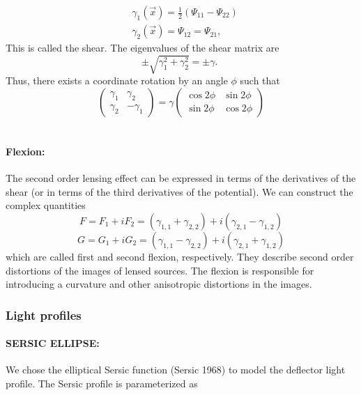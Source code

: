 \documentclass{aa}
\begin{document}
\begin{equation}
    \begin{aligned}
        & \gamma_1(\vec{x})=\frac{1}{2}\left(\Psi_{11}-\Psi_{22}\right) \\
        & \gamma_2(\vec{x})=\Psi_{12}=\Psi_{21},
    \end{aligned}
\end{equation}
%
This is called the shear. The eigenvalues of the shear matrix are
$$
\pm \sqrt{\gamma_1^2+\gamma_2^2}= \pm \gamma \text {. }
$$
Thus, there exists a coordinate rotation by an angle $\phi$ such that
$$
\left(\begin{array}{cc}
\gamma_1 & \gamma_2 \\
\gamma_2 & -\gamma_1
\end{array}\right)=\gamma\left(\begin{array}{cc}
\cos 2 \phi & \sin 2 \phi \\
\sin 2 \phi & \cos 2 \phi
\end{array}\right)
$$
\\
\newline 
\paragraph{\textbf{Flexion:}} The second order lensing effect can be expressed in terms of the derivatives of the shear (or in terms of the third derivatives of the potential). We can construct the complex quantities
$$
F= F_1 + iF_2 = \left(\gamma_{\mathrm{1,1}} + \gamma_{\mathrm{2,2}}\right) + i\left(\gamma_{\mathrm{2,1}} - \gamma_{\mathrm{1,2}}\right)
$$
$$
G= G_1 + iG_2 = \left(\gamma_{\mathrm{1,1}} - \gamma_{\mathrm{2,2}}\right) + i\left(\gamma_{\mathrm{2,1}} + \gamma_{\mathrm{1,2}}\right)
$$
which are called first and second flexion, respectively. They describe second order distortions of the images of lensed sources. The flexion is responsible for introducing a curvature and other anisotropic distortions
in the images.


\subsubsection{Light profiles}
\paragraph{\textbf{SERSIC ELLIPSE:}}
We chose the elliptical Sersic function (Sersic 1968) to model the deflector light profile. The Sersic profile is parameterized as
\end{document}
